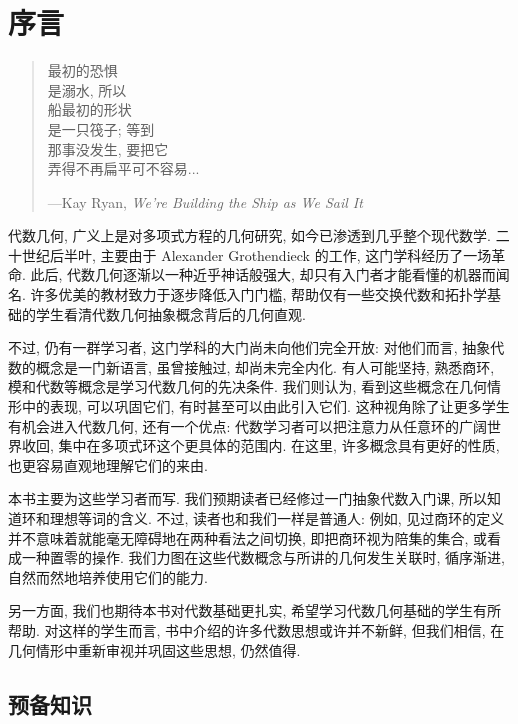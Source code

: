\chapter*{序言}\label{chap:preface}

\begin{quote}
最初的恐惧\\
是溺水, 所以\\
船最初的形状\\
是一只筏子; 等到\\
那事没发生, 要把它\\
弄得不再扁平可不容易...

\hfill ---Kay Ryan, \emph{We're Building the Ship as We Sail It}
\end{quote}

代数几何, 广义上是对多项式方程的几何研究, 如今已渗透到几乎整个现代数学. 二十世纪后半叶, 主要由于 Alexander Grothendieck 的工作, 这门学科经历了一场革命. 此后, 代数几何逐渐以一种近乎神话般强大, 却只有入门者才能看懂的机器而闻名. 许多优美的教材致力于逐步降低入门门槛, 帮助仅有一些交换代数和拓扑学基础的学生看清代数几何抽象概念背后的几何直观.

不过, 仍有一群学习者, 这门学科的大门尚未向他们完全开放: 对他们而言, 抽象代数的概念是一门新语言, 虽曾接触过, 却尚未完全内化. 有人可能坚持, 熟悉商环, 模和代数等概念是学习代数几何的先决条件. 我们则认为, 看到这些概念在几何情形中的表现, 可以巩固它们, 有时甚至可以由此引入它们. 这种视角除了让更多学生有机会进入代数几何, 还有一个优点: 代数学习者可以把注意力从任意环的广阔世界收回, 集中在多项式环这个更具体的范围内. 在这里, 许多概念具有更好的性质, 也更容易直观地理解它们的来由.

本书主要为这些学习者而写. 我们预期读者已经修过一门抽象代数入门课, 所以知道\textquotedbl{}环\textquotedbl{}和\textquotedbl{}理想\textquotedbl{}等词的含义. 不过, 读者也和我们一样是普通人: 例如, 见过商环的定义并不意味着就能毫无障碍地在两种看法之间切换, 即把商环视为陪集的集合, 或看成一种\textquotedbl{}置零\textquotedbl{}的操作. 我们力图在这些代数概念与所讲的几何发生关联时, 循序渐进, 自然而然地培养使用它们的能力.

另一方面, 我们也期待本书对代数基础更扎实, 希望学习代数几何基础的学生有所帮助. 对这样的学生而言, 书中介绍的许多代数思想或许并不新鲜, 但我们相信, 在几何情形中重新审视并巩固这些思想, 仍然值得.

\section*{预备知识}

